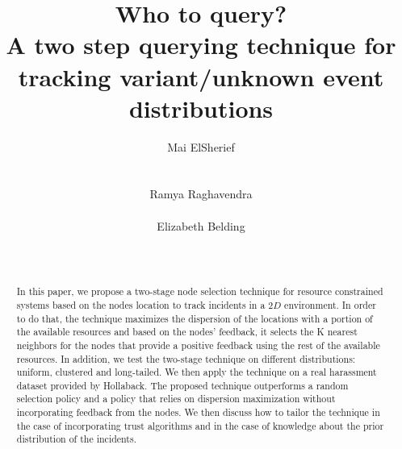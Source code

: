 \documentclass{acm_proc_article-sp}
\begin{document}
\title{Who to query? \\A two step querying technique for tracking variant/unknown event distributions }

\author{
%
%
\alignauthor
Mai ElSherief\\
    \\
    \\
    \alignauthor
Ramya Raghavendra\\
    \\
\alignauthor
Elizabeth Belding\\
   \\
    \\
}

\maketitle


\begin{abstract}
In this paper, we propose a two-stage node selection technique for resource constrained systems based on the nodes location to track incidents in a $2D$ environment.
In order to do that, the technique maximizes the dispersion of the locations with a portion of the available resources and based on the nodes' feedback, it selects the K nearest neighbors for the nodes that provide a positive feedback using the rest of the available resources. In addition, we test the two-stage technique on different distributions: uniform, clustered and long-tailed. We then apply the technique on a real harassment dataset provided by Hollaback. The proposed technique outperforms a random selection policy and a policy that relies on dispersion maximization without incorporating feedback from the nodes. We then discuss how to tailor the technique in the case of incorporating trust algorithms and in the case of knowledge about the prior distribution of the incidents.

\end{abstract}
\end{document}

